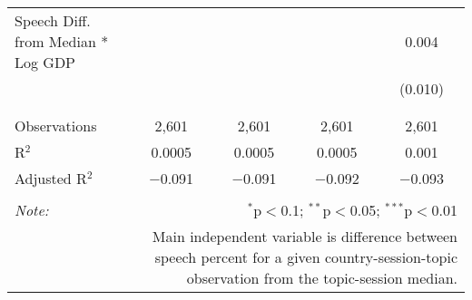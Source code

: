 \begin{table}[!htbp]
\begin{tabular}{@{\extracolsep{5pt}}lcccc}
 Speech Diff. from Median * Log GDP &  &  &  & 0.004 \\ 
  &  &  &  & (0.010) \\ 
  & & & & \\ 
\hline \\[-1.8ex] 
Observations & 2,601 & 2,601 & 2,601 & 2,601 \\ 
R$^{2}$ & 0.0005 & 0.0005 & 0.0005 & 0.001 \\ 
Adjusted R$^{2}$ & $-$0.091 & $-$0.091 & $-$0.092 & $-$0.093 \\ 
\hline 
\hline \\[-1.8ex] 
\textit{Note:}  & \multicolumn{4}{r}{$^{*}$p$<$0.1; $^{**}$p$<$0.05; $^{***}$p$<$0.01} \\ 
 & \multicolumn{4}{r}{Main independent variable is difference between speech percent for a given country-session-topic observation from the topic-session median.} \\ 
\end{tabular} 
\end{table} 
